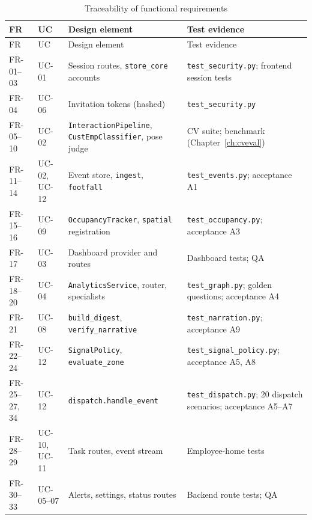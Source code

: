 \begin{longtable}{P{0.15\textwidth}P{0.14\textwidth}P{0.33\textwidth}P{0.3\textwidth}}
\caption{Traceability of functional requirements}\label{tab:trace}\\
\toprule
FR & UC & Design element & Test evidence\\
\midrule
\endfirsthead
\toprule
FR & UC & Design element & Test evidence\\
\midrule
\endhead
\bottomrule
\endfoot
FR-01--03 & UC-01 & Session routes, \texttt{store\_core} accounts & \texttt{test\_security.py}; frontend session tests\\
FR-04 & UC-06 & Invitation tokens (hashed) & \texttt{test\_security.py}\\
FR-05--10 & UC-02 & \texttt{InteractionPipeline}, \texttt{CustEmpClassifier}, pose judge & CV suite; benchmark (Chapter~\ref{ch:cveval})\\
FR-11--14 & UC-02, UC-12 & Event store, \texttt{ingest}, \texttt{footfall} & \texttt{test\_events.py}; acceptance A1\\
FR-15--16 & UC-09 & \texttt{OccupancyTracker}, \texttt{spatial} registration & \texttt{test\_occupancy.py}; acceptance A3\\
FR-17 & UC-03 & Dashboard provider and routes & Dashboard tests; QA\\
FR-18--20 & UC-04 & \texttt{AnalyticsService}, router, specialists & \texttt{test\_graph.py}; golden questions; acceptance A4\\
FR-21 & UC-08 & \texttt{build\_digest}, \texttt{verify\_narrative} & \texttt{test\_narration.py}; acceptance A9\\
FR-22--24 & UC-12 & \texttt{SignalPolicy}, \texttt{evaluate\_zone} & \texttt{test\_signal\_policy.py}; acceptance A5, A8\\
FR-25--27, 34 & UC-12 & \texttt{dispatch.handle\_event} & \texttt{test\_dispatch.py}; 20 dispatch scenarios; acceptance A5--A7\\
FR-28--29 & UC-10, UC-11 & Task routes, event stream & Employee-home tests\\
FR-30--33 & UC-05--07 & Alerts, settings, status routes & Backend route tests; QA\\
\end{longtable}
